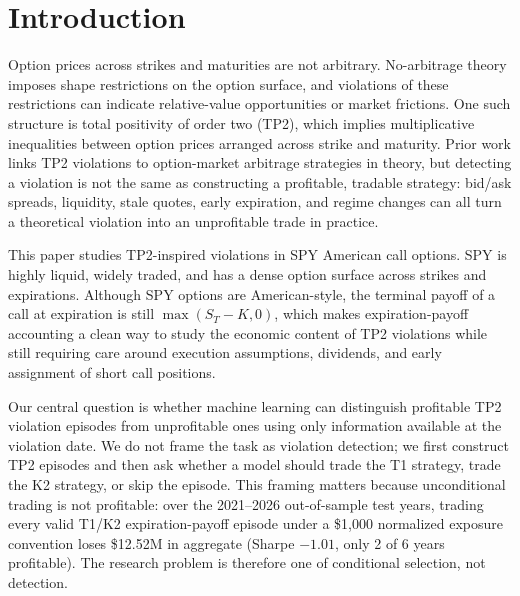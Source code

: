 \documentclass[sigconf,review,anonymous]{acmart}
\begin{document}


\maketitle

\section{Introduction}
\label{sec:intro}

Option prices across strikes and maturities are not arbitrary. No-arbitrage theory imposes shape restrictions on the option surface, and violations of these restrictions can indicate relative-value opportunities or market frictions. One such structure is total positivity of order two (TP2), which implies multiplicative inequalities between option prices arranged across strike and maturity. Prior work links TP2 violations to option-market arbitrage strategies in theory, but detecting a violation is not the same as constructing a profitable, tradable strategy: bid/ask spreads, liquidity, stale quotes, early expiration, and regime changes can all turn a theoretical violation into an unprofitable trade in practice.

This paper studies TP2-inspired violations in SPY American call options. SPY is highly liquid, widely traded, and has a dense option surface across strikes and expirations. Although SPY options are American-style, the terminal payoff of a call at expiration is still $\max(S_T-K,0)$, which makes expiration-payoff accounting a clean way to study the economic content of TP2 violations while still requiring care around execution assumptions, dividends, and early assignment of short call positions.

Our central question is whether machine learning can distinguish profitable TP2 violation episodes from unprofitable ones using only information available at the violation date. We do not frame the task as violation detection; we first construct TP2 episodes and then ask whether a model should trade the T1 strategy, trade the K2 strategy, or skip the episode. This framing matters because unconditional trading is not profitable: over the 2021--2026 out-of-sample test years, trading every valid T1/K2 expiration-payoff episode under a \$1,000 normalized exposure convention loses \$12.52M in aggregate (Sharpe $-1.01$, only 2 of 6 years profitable). The research problem is therefore one of conditional selection, not detection.
\end{document}
